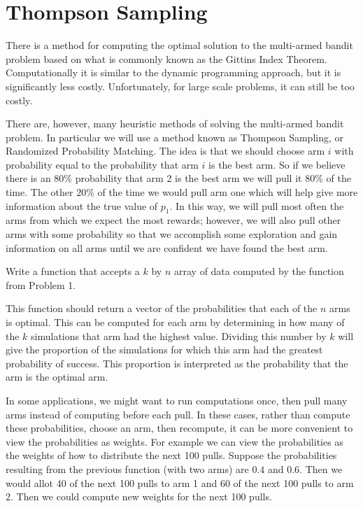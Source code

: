 \section*{Thompson Sampling}
There is a method for computing the optimal solution to the multi-armed bandit problem based on what is commonly known as the Gittins Index Theorem.  Computationally it is similar to the dynamic programming approach, but it is significantly less costly.  Unfortunately, for large scale problems, it can still be too costly.

There are, however, many heuristic methods of solving the multi-armed bandit problem.  In particular we will use a method known as Thompson Sampling, or Randomized Probability Matching.  The idea is that we should choose arm $i$ with probability equal to the probability that arm $i$ is the best arm.  So if we believe there is an $80\%$ probability that arm 2 is the best arm we will pull it $80\%$ of the time.  The other $20\%$ of the time we would pull arm one which will help give more information about the true value of $p_1$.  In this way, we will pull most often the arms from which we expect the most rewards; however, we will also pull other arms with some probability so that we accomplish some exploration and gain information on all arms until we are confident we have found the best arm.

\begin{problem}
Write a function that accepts a $k$ by $n$ array of data computed by the function from Problem 1.

This function should return a vector of the probabilities that each of the $n$ arms is optimal.  This can be computed for each arm by determining in how many of the $k$ simulations that arm had the highest value.  Dividing this number by $k$ will give the proportion of the simulations for which this arm had the greatest probability of success.  This proportion is interpreted as the probability that the arm is the optimal arm.
\end{problem}

In some applications, we might want to run computations once, then pull many arms instead of computing before each pull.  In these cases, rather than compute these probabilities, choose an arm, then recompute, it can be more convenient to view the probabilities as weights.  For example we can view the probabilities as the weights of how to distribute the next 100 pulls.  Suppose the probabilities resulting from the previous function (with two arms) are $0.4$ and $0.6$.  Then we would allot 40 of the next 100 pulls to arm 1 and 60 of the next 100 pulls to arm 2.  Then we could compute new weights for the next 100 pulls.


